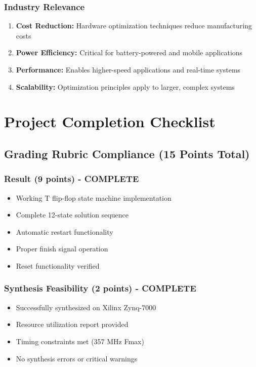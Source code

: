 \documentclass[12pt,letterpaper]{article}
\begin{document}
\subsubsection{Industry Relevance}
\begin{enumerate}
    \item \textbf{Cost Reduction:} Hardware optimization techniques reduce manufacturing costs
    \item \textbf{Power Efficiency:} Critical for battery-powered and mobile applications
    \item \textbf{Performance:} Enables higher-speed applications and real-time systems
    \item \textbf{Scalability:} Optimization principles apply to larger, complex systems
\end{enumerate}

\newpage

\section{Project Completion Checklist}

\subsection{Grading Rubric Compliance (15 Points Total)}

\subsubsection{Result (9 points) - COMPLETE \checkmark}
\begin{itemize}[label=$\checkmark$]
    \item Working T flip-flop state machine implementation
    \item Complete 12-state solution sequence
    \item Automatic restart functionality
    \item Proper finish signal operation
    \item Reset functionality verified
\end{itemize}

\subsubsection{Synthesis Feasibility (2 points) - COMPLETE \checkmark}
\begin{itemize}[label=$\checkmark$]
    \item Successfully synthesized on Xilinx Zynq-7000
    \item Resource utilization report provided
    \item Timing constraints met (357 MHz Fmax)
    \item No synthesis errors or critical warnings
\end{itemize}
\end{document}

